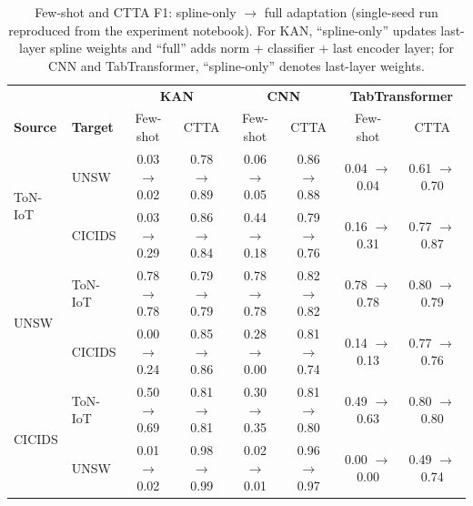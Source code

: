 \documentclass[10pt, conference, letterpaper]{IEEEtran}
\begin{document}
\begin{table}[t]
\centering
\caption{Few-shot and CTTA F1: spline-only $\rightarrow$ full adaptation (single-seed run reproduced from the experiment notebook). For KAN, ``spline-only'' updates last-layer spline weights and ``full'' adds norm + classifier + last encoder layer; for CNN and TabTransformer, ``spline-only'' denotes last-layer weights.}
\label{tab:fewshot_ctta_comparison}
\setlength{\tabcolsep}{4pt}
\begin{tabular}{l|l|cc|cc|cc}
\toprule
 & & \multicolumn{2}{c|}{\textbf{KAN}} & \multicolumn{2}{c|}{\textbf{CNN}} & \multicolumn{2}{c}{\textbf{TabTransformer}} \\
\textbf{Source} & \textbf{Target} & Few-shot & CTTA & Few-shot & CTTA & Few-shot & CTTA \\
\midrule
\multirow{2}{*}{ToN-IoT}
    & UNSW    & 0.03 $\rightarrow$ 0.02 & 0.78 $\rightarrow$ 0.89 & 0.06 $\rightarrow$ 0.05 & 0.86 $\rightarrow$ 0.88 & 0.04 $\rightarrow$ 0.04 & 0.61 $\rightarrow$ 0.70 \\
    & CICIDS  & 0.03 $\rightarrow$ 0.29 & 0.86 $\rightarrow$ 0.84 & 0.44 $\rightarrow$ 0.18 & 0.79 $\rightarrow$ 0.76 & 0.16 $\rightarrow$ 0.31 & 0.77 $\rightarrow$ 0.87 \\
\midrule
\multirow{2}{*}{UNSW}
    & ToN-IoT & 0.78 $\rightarrow$ 0.78 & 0.79 $\rightarrow$ 0.79 & 0.78 $\rightarrow$ 0.78 & 0.82 $\rightarrow$ 0.82 & 0.78 $\rightarrow$ 0.78 & 0.80 $\rightarrow$ 0.79 \\
    & CICIDS  & 0.00 $\rightarrow$ 0.24 & 0.85 $\rightarrow$ 0.86 & 0.28 $\rightarrow$ 0.00 & 0.81 $\rightarrow$ 0.74 & 0.14 $\rightarrow$ 0.13 & 0.77 $\rightarrow$ 0.76 \\
\midrule
\multirow{2}{*}{CICIDS}
    & ToN-IoT & 0.50 $\rightarrow$ 0.69 & 0.81 $\rightarrow$ 0.81 & 0.30 $\rightarrow$ 0.35 & 0.81 $\rightarrow$ 0.80 & 0.49 $\rightarrow$ 0.63 & 0.80 $\rightarrow$ 0.80 \\
    & UNSW    & 0.01 $\rightarrow$ 0.02 & 0.98 $\rightarrow$ 0.99 & 0.02 $\rightarrow$ 0.01 & 0.96 $\rightarrow$ 0.97 & 0.00 $\rightarrow$ 0.00 & 0.49 $\rightarrow$ 0.74 \\
\bottomrule
\end{tabular}
\end{table}
\end{document}
